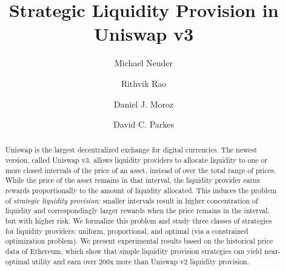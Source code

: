 \documentclass[sigconf, usenames, dvipsnames]{acmart}
\begin{document}
\title{Strategic Liquidity Provision in Uniswap v3}

\author{Michael Neuder}

\author{Rithvik Rao}

\author{Daniel J. Moroz}

\author{David C. Parkes}


\begin{abstract}
Uniswap is the largest decentralized exchange for digital currencies. The newest version, called Uniswap v3, allows liquidity providers to allocate liquidity to one or more closed intervals of the price of an asset, instead of over the total range of prices. While the price of the asset remains in that interval, the liquidity provider earns rewards proportionally to the amount of liquidity allocated. This induces the problem of {\em strategic liquidity provision}: smaller intervals result in higher concentration of liquidity and correspondingly larger rewards when the price remains in the interval, but with higher risk. We formalize this problem and study three classes of strategies for liquidity providers: uniform, proportional, and optimal (via a constrained optimization problem). We present experimental results based on the historical price data of Ethereum, which show that simple liquidity provision strategies can yield near-optimal utility and earn over 200x more than Uniswap v2 liquidity provision.
\end{abstract}
\end{document}
